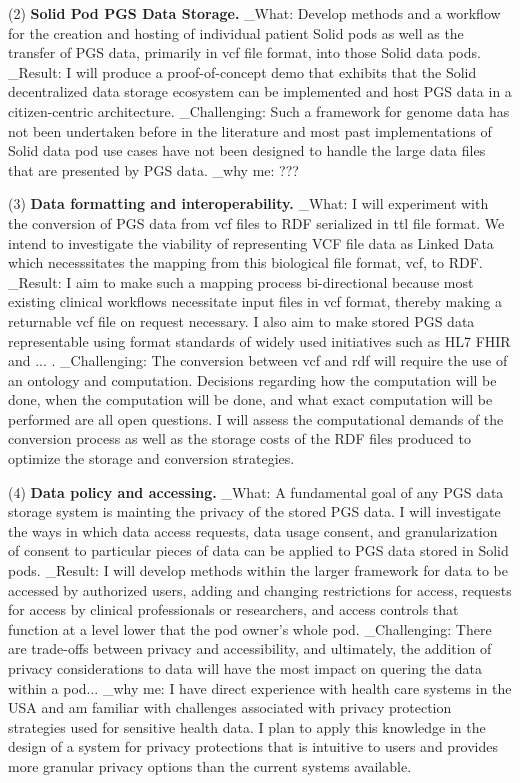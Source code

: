 \documentclass{article}
\begin{document}
(2) \textbf{Solid Pod PGS Data Storage.}
_What: Develop methods and a workflow for the creation and hosting of individual patient Solid pods as well as the transfer of PGS data, primarily in vcf file format, into those Solid data pods. 
_Result: I will produce a proof-of-concept demo that exhibits that the Solid decentralized data storage ecosystem can be implemented and host PGS data in a citizen-centric architecture.
_Challenging: Such a framework for genome data has not been undertaken before in the literature and most past implementations of Solid data pod use cases have not been designed to handle the large data files that are presented by PGS data. 
_why me: ???


(3) \textbf{Data formatting and interoperability.} 
_What: I will experiment with the conversion of PGS data from vcf files to RDF serialized in ttl file format. 
We intend to investigate the viability of representing VCF file data as Linked Data which necesssitates the mapping from this biological file format, vcf, to RDF. 
_Result: I aim to make such a mapping process bi-directional because most existing clinical workflows necessitate input files in vcf format, thereby making a returnable vcf file on request necessary. 
I also aim to make stored PGS data representable using format standards of widely used initiatives such as HL7 FHIR and ... . 
_Challenging: The conversion between vcf and rdf will require the use of an ontology and computation. 
Decisions regarding how the computation will be done, when the computation will be done, and what exact computation will be performed are all open questions.
I will assess the computational demands of the conversion process as well as the storage costs of the RDF files produced to optimize the storage and conversion strategies.


(4) \textbf{Data policy and accessing.} 
_What: A fundamental goal of any PGS data storage system is mainting the privacy of the stored PGS data. 
I will investigate the ways in which data access requests, data usage consent, and granularization of consent to particular pieces of data can be applied to PGS data stored in Solid pods.
_Result: I will develop methods within the larger framework for data to be accessed by authorized users, adding and changing restrictions for access, requests for access by clinical professionals or researchers, and access controls that function at a level lower that the pod owner's whole pod.
_Challenging: There are trade-offs between privacy and accessibility, and ultimately, the addition of privacy considerations to data will have the most impact on quering the data within a pod...
_why me: I have direct experience with health care systems in the USA and am familiar with challenges associated with privacy protection strategies used for sensitive health data. 
I plan to apply this knowledge in the design of a system for privacy protections that is intuitive to users and provides more granular privacy options than the current systems available. 
\end{document}
